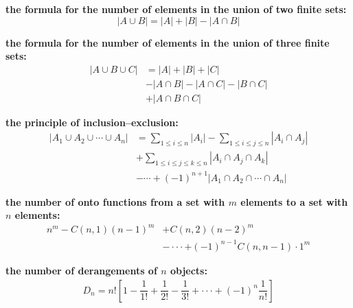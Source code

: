 \documentclass[11pt]{article}
\begin{document}
\begin{multicols}{2}
\textbf{the formula for the number of elements in the union of two finite sets:}
\begin{equation*}
    |A \cup B| = |A| + |B| - |A \cap B|
\end{equation*}

\textbf{the formula for the number of elements in the union of three finite sets:}
\begin{align*}
    |A \cup B \cup C| &= |A| + |B| + |C|\\
    &- |A \cap B| - |A \cap C| - |B \cap C|\\
    &+ |A \cap B \cap C|
\end{align*}

\textbf{the principle of inclusion–exclusion:}
\begin{align*}
    |A_1 \cup A_2 \cup \cdots \cup A_n| &= \sum_{1 \leq i \leq n} |A_i| - \sum_{1 \leq i \leq j \leq n} |A_i \cap A_j|\\
    &+ \sum_{1 \leq i \leq j \leq k \leq n} |A_i \cap A_j \cap A_k|\\
    &- \cdots + (-1)^{n+1} |A_1 \cap A_2 \cap \cdots \cap A_n|
\end{align*}

\textbf{the number of onto functions from a set with $m$ elements to a set with $n$ elements:}
\begin{align*}
    n^m - C(n, 1)(n - 1)^m &+ C(n, 2)(n - 2)^m\\
    &- \cdot \cdot \cdot + (-1)^{n-1}C(n, n - 1) \cdot 1^m
\end{align*}

\textbf{the number of derangements of $n$ objects:}
\begin{align*}
    D_n = n! \left[ 1 - \dfrac{1}{1!} + \dfrac{1}{2!} - \dfrac{1}{3!} + \cdot \cdot \cdot + (-1)^n \dfrac{1}{n!} \right]
\end{align*}
\end{multicols}
\end{document}
